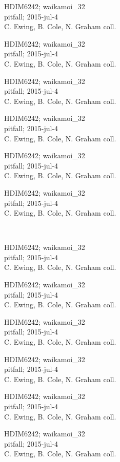 \documentclass[2pt]{extarticle}
\begin{document}
\noindent
\parbox{0.16\textwidth}{\tiny \raggedright \rule[-0.3\baselineskip]{0pt}{10pt}HDIM6242; waikamoi\_32\\ pitfall; 2015-jul-4\\ C. Ewing, B. Cole, N. Graham coll.}
\parbox{0.16\textwidth}{\tiny \raggedright \rule[-0.3\baselineskip]{0pt}{10pt}HDIM6242; waikamoi\_32\\ pitfall; 2015-jul-4\\ C. Ewing, B. Cole, N. Graham coll.}
\parbox{0.16\textwidth}{\tiny \raggedright \rule[-0.3\baselineskip]{0pt}{10pt}HDIM6242; waikamoi\_32\\ pitfall; 2015-jul-4\\ C. Ewing, B. Cole, N. Graham coll.}
\parbox{0.16\textwidth}{\tiny \raggedright \rule[-0.3\baselineskip]{0pt}{10pt}HDIM6242; waikamoi\_32\\ pitfall; 2015-jul-4\\ C. Ewing, B. Cole, N. Graham coll.}
\parbox{0.16\textwidth}{\tiny \raggedright \rule[-0.3\baselineskip]{0pt}{10pt}HDIM6242; waikamoi\_32\\ pitfall; 2015-jul-4\\ C. Ewing, B. Cole, N. Graham coll.}
\parbox{0.16\textwidth}{\tiny \raggedright \rule[-0.3\baselineskip]{0pt}{10pt}HDIM6242; waikamoi\_32\\ pitfall; 2015-jul-4\\ C. Ewing, B. Cole, N. Graham coll.} \\ 
\vspace{0.001in} 

\noindent
\parbox{0.16\textwidth}{\tiny \raggedright \rule[-0.3\baselineskip]{0pt}{10pt}HDIM6242; waikamoi\_32\\ pitfall; 2015-jul-4\\ C. Ewing, B. Cole, N. Graham coll.}
\parbox{0.16\textwidth}{\tiny \raggedright \rule[-0.3\baselineskip]{0pt}{10pt}HDIM6242; waikamoi\_32\\ pitfall; 2015-jul-4\\ C. Ewing, B. Cole, N. Graham coll.}
\parbox{0.16\textwidth}{\tiny \raggedright \rule[-0.3\baselineskip]{0pt}{10pt}HDIM6242; waikamoi\_32\\ pitfall; 2015-jul-4\\ C. Ewing, B. Cole, N. Graham coll.}
\parbox{0.16\textwidth}{\tiny \raggedright \rule[-0.3\baselineskip]{0pt}{10pt}HDIM6242; waikamoi\_32\\ pitfall; 2015-jul-4\\ C. Ewing, B. Cole, N. Graham coll.}
\parbox{0.16\textwidth}{\tiny \raggedright \rule[-0.3\baselineskip]{0pt}{10pt}HDIM6242; waikamoi\_32\\ pitfall; 2015-jul-4\\ C. Ewing, B. Cole, N. Graham coll.}
\parbox{0.16\textwidth}{\tiny \raggedright \rule[-0.3\baselineskip]{0pt}{10pt}HDIM6242; waikamoi\_32\\ pitfall; 2015-jul-4\\ C. Ewing, B. Cole, N. Graham coll.} \\ 
\vspace{0.001in} 
\end{document}

